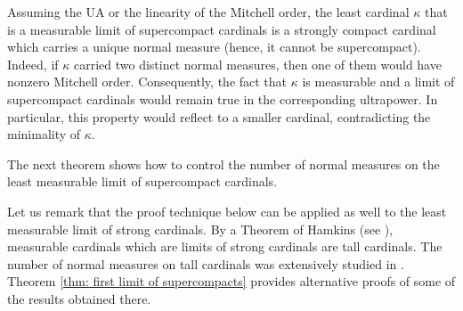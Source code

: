 \documentclass[11pt]{amsart}
\theoremstyle{definition}
\theoremstyle{remark}
\newcommand\<{{<}}
\begin{document}
Assuming the UA or the linearity of the Mitchell order, the least cardinal $\kappa$ that is a measurable limit of supercompact cardinals  
is a strongly compact cardinal which carries a unique normal measure (hence, it cannot be supercompact). Indeed, if $\kappa$ carried two distinct normal measures, then one of them would have nonzero Mitchell order. Consequently, the fact that $\kappa$ is measurable and a limit of supercompact cardinals would remain true in the corresponding ultrapower. In particular, this property would reflect to a smaller cardinal, contradicting the minimality of $\kappa$.

The next theorem shows how to control the number of normal measures on the least measurable limit of supercompact cardinals. 

Let us remark that the proof technique below can be applied as well to the least measurable limit of strong cardinals. By a Theorem of Hamkins (see \cite[Corollary 2.7]{HamkinsTall}), measurable cardinals which are limits of strong cardinals are tall cardinals. The number of normal measures on tall cardinals was extensively studied in \cite{ApterCummingsTall}. Theorem \ref{thm: first limit of supercompacts} provides alternative proofs of some of the results obtained there.
\end{document}
